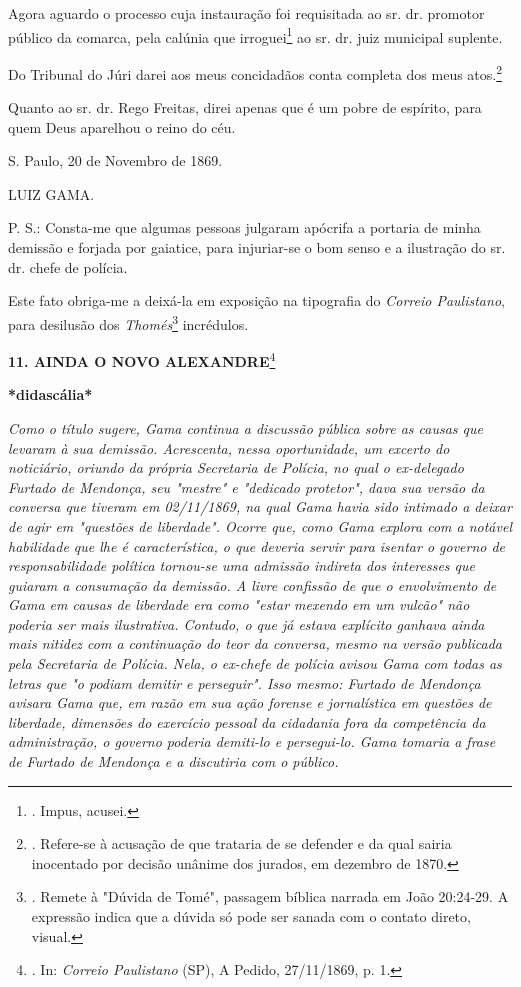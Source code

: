 Agora aguardo o processo cuja instauração foi requisitada ao sr. dr.
promotor público da comarca, pela calúnia que irroguei\footnote{. Impus,
  acusei.} ao sr. dr. juiz municipal suplente.

Do Tribunal do Júri darei aos meus concidadãos conta completa dos meus
atos.\footnote{. Refere-se à acusação de que trataria de se defender e
  da qual sairia inocentado por decisão unânime dos jurados, em dezembro
  de 1870.}

Quanto ao sr. dr. Rego Freitas, direi apenas que é um pobre de espírito,
para quem Deus aparelhou o reino do céu.

S. Paulo, 20 de Novembro de 1869.

LUIZ GAMA.

P. S.: Consta-me que algumas pessoas julgaram apócrifa a portaria de
minha demissão e forjada por gaiatice, para injuriar-se o bom senso e a
ilustração do sr. dr. chefe de polícia.

Este fato obriga-me a deixá-la em exposição na tipografia do
\emph{Correio Paulistano}, para desilusão dos \emph{Thomés}\footnote{.
  Remete à "Dúvida de Tomé", passagem bíblica narrada em João 20:24-29.
  A expressão indica que a dúvida só pode ser sanada com o contato
  direto, visual.} incrédulos.

\textbf{11. AINDA O NOVO ALEXANDRE}\footnote{. In: \emph{Correio
  Paulistano} (SP), A Pedido, 27/11/1869, p. 1.}

\textbf{*didascália*}

\emph{Como o título sugere, Gama continua a discussão pública sobre as
causas que levaram à sua demissão. Acrescenta, nessa oportunidade, um
excerto do noticiário, oriundo da própria Secretaria de Polícia, no qual
o ex-delegado Furtado de Mendonça, seu "mestre" e "dedicado protetor",
dava sua versão da conversa que tiveram em 02/11/1869, na qual Gama
havia sido intimado a deixar de agir em "questões de liberdade". Ocorre
que, como Gama explora com a notável habilidade que lhe é
característica, o que deveria servir para isentar o governo de
responsabilidade política tornou-se uma admissão indireta dos interesses
que guiaram a consumação da demissão. A livre confissão de que o
envolvimento de Gama em causas de liberdade era como "estar mexendo em
um vulcão" não poderia ser mais ilustrativa. Contudo, o que já estava
explícito ganhava ainda mais nitidez com a continuação do teor da
conversa, mesmo na versão publicada pela Secretaria de Polícia. Nela, o
ex-chefe de polícia avisou Gama com todas as letras que "o podiam
demitir e perseguir". Isso mesmo: Furtado de Mendonça avisara Gama que,
em razão em sua ação forense e jornalística em questões de liberdade,
dimensões do exercício pessoal da cidadania fora da competência da
administração, o governo poderia demiti-lo e persegui-lo. Gama tomaria a
frase de Furtado de Mendonça e a discutiria com o público.}

